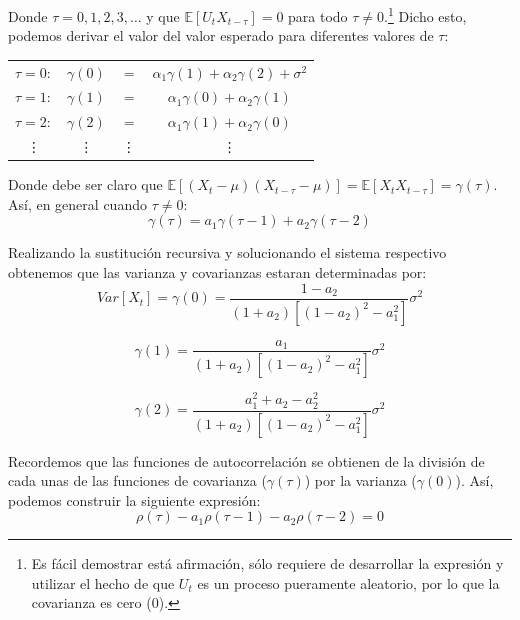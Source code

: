 \documentclass[
]{book}
\begin{document}
Donde \(\tau = 0, 1, 2, 3, \ldots\) y que \(\mathbb{E}[U_{t} X_{t - \tau}] = 0\) para todo \(\tau \neq 0\).\footnote{ Es fácil demostrar está afirmación, sólo requiere de desarrollar la expresión y utilizar el hecho de que $U_t$ es un proceso pueramente aleatorio, por lo que la covarianza es cero (0).} Dicho esto, podemos derivar el valor del valor esperado para diferentes valores de \(\tau\):

\begin{center}
\begin{tabular}{ c c c c } 
    $\tau = 0:$ & $\gamma(0)$ & $=$ & $\alpha_1 \gamma(1) + \alpha_2 \gamma(2) + \sigma^2$ \\
    $\tau = 1:$ & $\gamma(1)$ & $=$ & $\alpha_1 \gamma(0) + \alpha_2 \gamma(1)$ \\
    $\tau = 2:$ & $\gamma(2)$ & $=$ & $\alpha_1 \gamma(1) + \alpha_2 \gamma(0)$ \\
    \vdots & \vdots & \vdots & \vdots
\end{tabular}
\end{center}

Donde debe ser claro que \(\mathbb{E}[(X_{t} - \mu)(X_{t - \tau} - \mu)] = \mathbb{E}[X_{t} X_{t - \tau}] = \gamma(\tau)\). Así, en general cuando \(\tau \neq 0\):
\begin{equation}    
    \gamma(\tau) = a_1 \gamma(\tau - 1) + a_2 \gamma(\tau - 2)
\end{equation}

Realizando la sustitución recursiva y solucionando el sistema respectivo obtenemos que las varianza y covarianzas estaran determinadas por:
\begin{equation}
    Var[X_t] = \gamma(0) = \frac{1 - a_2}{(1 + a_2)[(1 - a_2)^2 - a^2_1]} \sigma^2
\end{equation}

\begin{equation}
    \gamma(1) = \frac{a_1}{(1 + a_2)[(1 - a_2)^2 - a^2_1]} \sigma^2
\end{equation}

\begin{equation}
    \gamma(2) = \frac{a^2_1 + a_2 - a^2_2}{(1 + a_2)[(1 - a_2)^2 - a^2_1]} \sigma^2
\end{equation}

Recordemos que las funciones de autocorrelación se obtienen de la división de cada unas de las funciones de covarianza (\(\gamma(\tau)\)) por la varianza (\(\gamma(0)\)). Así, podemos construir la siguiente expresión:
\begin{equation}
    \rho(\tau) - a_1 \rho(\tau - 1) - a_2 \rho(\tau - 2) = 0
\end{equation}
\end{document}
